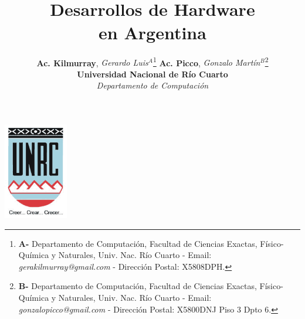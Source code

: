 \documentclass[%
  	final,
%
	notitlepage,
	narroweqnarray,
	inline,
 	twoside,
	]{ieee}
\begin{document}
\onecolumn
\title[Desarrollos de hardware en Argentina]{\sffamily \textbf{\vspace*{3cm}\\Desarrollos de Hardware \\en Argentina}}
\author{\textbf{Ac. Kilmurray}, \textit{Gerardo Luis$^{A}$}\footnote{\textbf{A-} Departamento de Computaci\'on, Facultad de Ciencias Exactas, F\'isico-Qu\'imica y Naturales, Univ. Nac. R\'io Cuarto - Email: \small{\textit{gerakilmurray@gmail.com}} - Direcci\'on Postal: X5808DPH.} \hspace{4cm} \textbf{Ac. Picco}, \textit{Gonzalo Mart\'in$^{B}$}\footnote{\textbf{B-} Departamento de Computaci\'on, Facultad de Ciencias Exactas, F\'isico-Qu\'imica y Naturales, Univ. Nac. R\'io Cuarto - Email: \small{\textit{gonzalopicco@gmail.com}} - Direcci\'on Postal: X5800DNJ Piso 3 Dpto 6.}\\[1cm]
	\large \textbf{Universidad Nacional de R\'io Cuarto}\\ \textit{Departamento de Computaci\'on}\\
	} 



\maketitle 
\vspace*{1cm}
\begin{center}\includegraphics[width=80pt, height=120pt]{unrc.png}\end{center} %
\vspace*{2cm}
\end{document}
